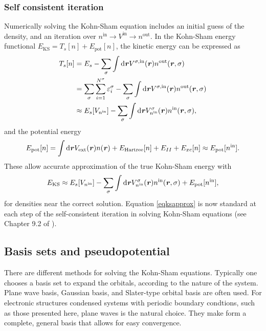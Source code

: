 \subsubsection{Self consistent iteration}
Numerically solving the Kohn-Sham equation includes an initial guess of the density,
and an iteration over $n^\text{in}\rightarrow V^\text{in}\rightarrow n^\text{out}$.
In the Kohn-Sham energy functional $E_\text{KS}=T_s[n]+E_\text{pot}[n]$, the kinetic
energy can be expressed as
%
\begin{equation}
\begin{aligned}
T_s[n] & =E_s-\sum_\sigma\int \mathrm{d}\textbf{\textit{r}} V^{\sigma,\text{in}}(\textbf{\textit{r}})n^\text{out}(\textbf{\textit{r}},\sigma) \\
 & =\sum_\sigma\sum_{i=1}^{N^\sigma}\varepsilon_i^\sigma-\sum_\sigma\int \mathrm{d}\textbf{\textit{r}} V^{\sigma,\text{in}}(\textbf{\textit{r}})n^\text{out}(\textbf{\textit{r}},\sigma) \\
& \approx E_s[V_{n^\text{in}}]-\sum_\sigma\int \mathrm{d}\textbf{\textit{r}} V^{\sigma}_{n^\text{in}}(\textbf{\textit{r}})n^\text{in}(\textbf{\textit{r}},\sigma), \label{eqtshwf}
\end{aligned}
\end{equation}
and the potential energy
\begin{equation}
E_\text{pot}[n]=\int \mathrm{d}\textbf{\textit{r}} V_\text{ext}(\textbf{\textit{r}})n(\textbf{\textit{r}})+E_\text{Hartree}[n]+E_{II}+E_{xc}[n]\approx E_\text{pot}[n^\text{in}]. \label{eqpot}
\end{equation}
These allow accurate approximation of the true Kohn-Sham energy with 
\begin{equation}
 E_\text{KS} \approx E_s[V_{n^\text{in}}]-\sum_\sigma\int \mathrm{d}\textbf{\textit{r}} V^{\sigma}_{n^\text{in}}(\textbf{\textit{r}})n^\text{in}(\textbf{\textit{r}},\sigma)+E_\text{pot}[n^\text{in}] \label{eqksapprox},
\end{equation}
for densities near the correct solution. Equation \ref{eqksapprox} is now standard at each step of the self-consistent iteration in solving Kohn-Sham equations (see Chapter 9.2 of \cite{martin-esbook}).

\subsection{Basis sets and pseudopotential}
There are different methods for solving the Kohn-Sham equations. Typically one
chooses a basis set to expand the orbitals, according to the nature of the system.
Plane wave basis, Gaussian basis, and Slater-type orbital basis are often used.  For
electronic structures condensed systems with periodic boundary condtions, such as
those presented here, plane waves is the  natural choice.  They make form a complete,
general basis that allows for easy convergence.


